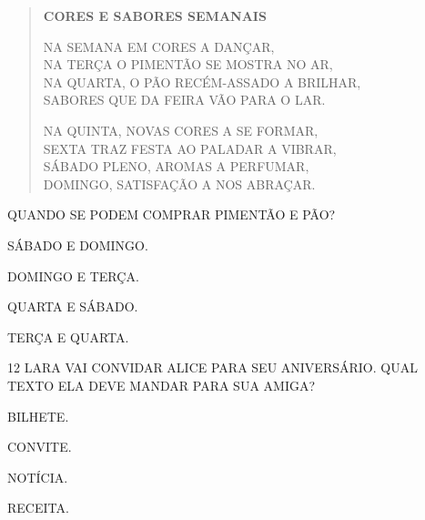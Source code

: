 \begin{myquote}
\begin{verse}
\textbf{CORES E SABORES SEMANAIS}

NA SEMANA EM CORES A DANÇAR,\\
NA TERÇA O PIMENTÃO SE MOSTRA NO AR,\\
NA QUARTA, O PÃO RECÉM-ASSADO A BRILHAR,\\
SABORES QUE DA FEIRA VÃO PARA O LAR.


NA QUINTA, NOVAS CORES A SE FORMAR,\\
SEXTA TRAZ FESTA AO PALADAR A VIBRAR,\\
SÁBADO PLENO, AROMAS A PERFUMAR,\\
DOMINGO, SATISFAÇÃO A NOS ABRAÇAR.
\end{verse}

\end{myquote}


QUANDO SE PODEM COMPRAR PIMENTÃO E PÃO?

\begin{multicols}{2}
\begin{escolha}
\item SÁBADO E DOMINGO.

\item DOMINGO E TERÇA.

\item QUARTA E SÁBADO.

\item TERÇA E QUARTA.
\end{escolha}
\end{multicols}

\num{12} LARA VAI CONVIDAR ALICE PARA SEU ANIVERSÁRIO. 
QUAL TEXTO ELA DEVE MANDAR PARA SUA AMIGA? 

\begin{multicols}{2}
\begin{escolha}
\item BILHETE.

\item CONVITE.

\item NOTÍCIA.

\item RECEITA.
\end{escolha}
\end{multicols}

